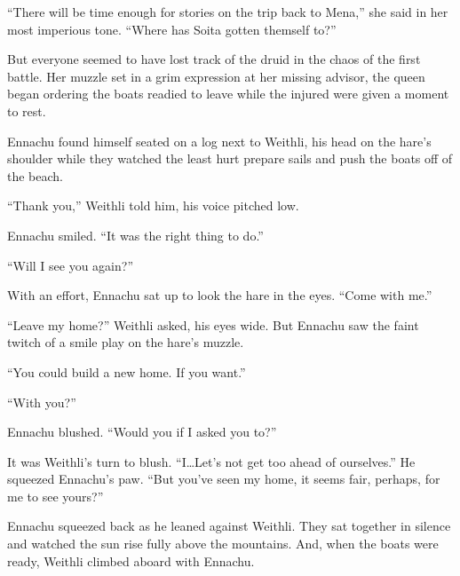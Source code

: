 ``There will be time enough for stories on the trip back to Mena,'' she said in her most imperious tone. ``Where has Soita gotten themself to?''

But everyone seemed to have lost track of the druid in the chaos of the first battle. Her muzzle set in a grim expression at her missing advisor, the queen began ordering the boats readied to leave while the injured were given a moment to rest.

Ennachu found himself seated on a log next to Weithli, his head on the hare's shoulder while they watched the least hurt prepare sails and push the boats off of the beach.

``Thank you,'' Weithli told him, his voice pitched low.

Ennachu smiled. ``It was the right thing to do.''

``Will I see you again?''

With an effort, Ennachu sat up to look the hare in the eyes. ``Come with me.''

``Leave my home?'' Weithli asked, his eyes wide. But Ennachu saw the faint twitch of a smile play on the hare's muzzle.

``You could build a new home. If you want.''

``With you?''

Ennachu blushed. ``Would you if I asked you to?''

It was Weithli's turn to blush. ``I\ldots{}Let's not get too ahead of ourselves.'' He squeezed Ennachu's paw. ``But you've seen my home, it seems fair, perhaps, for me to see yours?''

Ennachu squeezed back as he leaned against Weithli. They sat together in silence and watched the sun rise fully above the mountains. And, when the boats were ready, Weithli climbed aboard with Ennachu.

